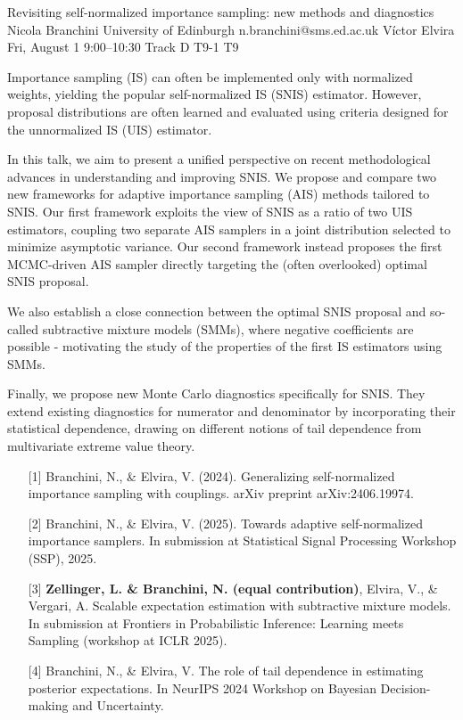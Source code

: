 \begin{talk}
  {Revisiting self-normalized importance sampling: new methods and diagnostics}%
  {Nicola Branchini}%
  {University of Edinburgh}%
  {n.branchini@sms.ed.ac.uk}%
  {Víctor Elvira}%
  {}%
  {Fri, August 1 9:00–10:30 Track D}%
  {T9-1}%
  {T9}%
  
				
			
Importance sampling (IS) can often be implemented only with normalized weights, yielding the popular self-normalized IS (SNIS) estimator. However, proposal distributions are often learned and evaluated using criteria designed for the unnormalized IS (UIS) estimator.

In this talk, we aim to present a unified perspective on recent methodological advances in understanding and improving SNIS.
We propose and compare two new frameworks for adaptive importance sampling (AIS) methods tailored to SNIS. Our first framework exploits the view of SNIS as a ratio of two UIS estimators, coupling two separate AIS samplers in a joint distribution selected to minimize asymptotic variance. Our second framework instead proposes the first MCMC-driven AIS sampler directly targeting the (often overlooked) optimal SNIS proposal.

We also establish a close connection between the optimal SNIS proposal and so-called subtractive mixture models (SMMs), where negative coefficients are possible - motivating the study of the properties of the first IS estimators using SMMs.

Finally, we propose new Monte Carlo diagnostics specifically for SNIS. They extend existing diagnostics for numerator and denominator by incorporating their statistical dependence, drawing on different notions of tail dependence from multivariate extreme value theory.

\medskip

\begin{enumerate}
	\item[{[1]}] Branchini, N., \& Elvira, V. (2024). Generalizing self-normalized importance sampling with couplings. arXiv preprint arXiv:2406.19974.
	\item[{[2]}] Branchini, N., \& Elvira, V. (2025). Towards adaptive self-normalized importance samplers. In submission at Statistical Signal Processing Workshop (SSP), 2025.
    \item[{[3]}] \textbf{Zellinger, L. \& Branchini, N. (equal contribution)}, Elvira, V., \& Vergari, A. Scalable expectation estimation with subtractive mixture models. In submission at Frontiers in Probabilistic Inference: Learning meets Sampling (workshop at ICLR 2025).
    \item[{[4]}] Branchini, N., \& Elvira, V. The role of tail dependence in estimating posterior expectations. In NeurIPS 2024 Workshop on Bayesian Decision-making and Uncertainty.


\end{enumerate}

\end{talk}

